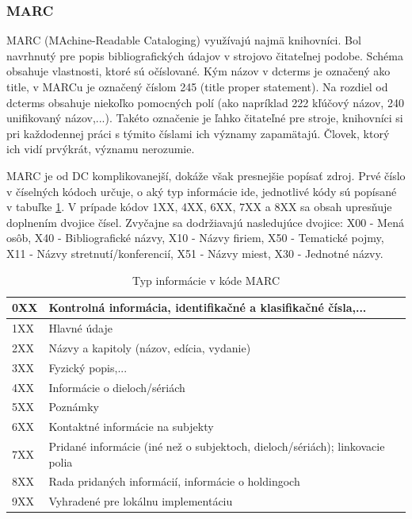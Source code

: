 \documentclass[thesis=M,slovak]{FITthesis}[2013/05/06]
\begin{document}
\subsubsection{MARC}
MARC (MAchine-Readable Cataloging) využívajú najmä knihovníci. Bol navrhnutý pre popis bibliografických údajov v strojovo čitateľnej podobe.
Schéma obsahuje vlastnosti, ktoré sú očíslované. Kým názov v dcterms je označený ako title, v MARCu  je označený číslom 245 (title proper statement). Na rozdiel od dcterms obsahuje niekoľko pomocných polí (ako napríklad 222 kľúčový názov, 240 unifikovaný názov,...).\cite[s.~288-289]{witten2009build} Takéto označenie je ľahko čitateľné pre stroje, knihovníci si pri každodennej práci s týmito číslami ich významy zapamätajú. Človek, ktorý ich vidí prvýkrát, významu nerozumie.

MARC je od DC komplikovanejší, dokáže však presnejšie popísať zdroj.
Prvé číslo v číselných kódoch určuje, o aký typ informácie ide, jednotlivé kódy sú popísané v tabuľke \ref{tab:marc}. V prípade kódov 1XX, 4XX, 6XX, 7XX a 8XX sa obsah upresňuje doplnením dvojice čísel. Zvyčajne sa dodržiavajú nasledujúce dvojice: X00 - Mená osôb, X40 - Bibliografické názvy, X10 - Názvy firiem, X50 - Tematické pojmy, X11 - Názvy stretnutí/konferencií, X51 - Názvy miest, X30 - Jednotné názvy.

\begin{table}[!htbp]\centering
 	\caption[MARC]{Typ informácie v kóde MARC}\label{tab:marc}
\begin{tabularx}{\textwidth}{|l|X|} \hline
0XX	& Kontrolná informácia, identifikačné a klasifikačné čísla,... \\ \hline
1XX	& Hlavné údaje \\ \hline
2XX	& Názvy a kapitoly (názov, edícia, vydanie) \\ \hline
3XX	& Fyzický popis,... \\ \hline
4XX	& Informácie o dieloch/sériách \\ \hline
5XX	& Poznámky \\ \hline
6XX	& Kontaktné informácie na subjekty \\ \hline
7XX	& Pridané informácie (iné než o subjektoch, dieloch/sériách); linkovacie polia \\ \hline
8XX	& Rada pridaných informácií, informácie o holdingoch \\ \hline
9XX	& Vyhradené pre lokálnu implementáciu \\ \hline
\end{tabularx}
\end{table}
\end{document}
